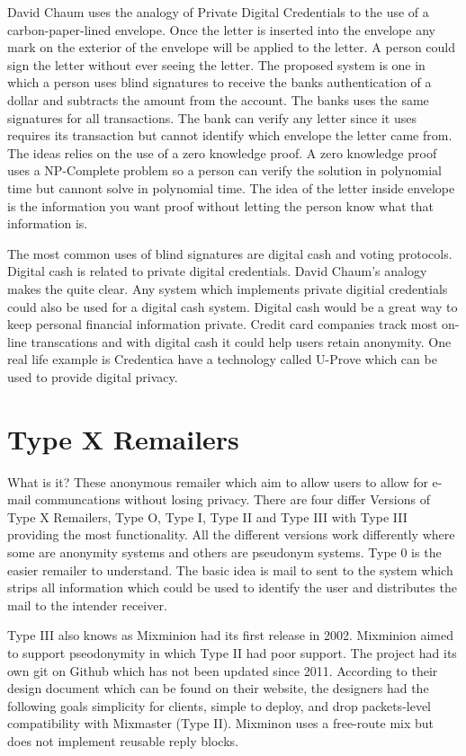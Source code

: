 \documentclass[12pt]{article}
\begin{document}
David Chaum uses the analogy of Private Digital Credentials to the use of a carbon-paper-lined envelope. Once the letter is inserted into the envelope any mark on the exterior of the envelope will be applied to the letter. A person could sign the letter without ever seeing the letter. The proposed system is one in which a person uses blind signatures to receive the banks authentication of a dollar and subtracts the amount from the account. The banks uses the same signatures for all transactions. The bank can verify any letter since it uses requires its transaction but cannot identify which envelope the letter came from. The ideas relies on the use of a zero knowledge proof. A zero knowledge proof uses a NP-Complete problem so a person can verify the solution in polynomial time but cannont solve in polynomial time. The idea of the letter inside envelope is the information you want proof without letting the person know what that information is.

The most common uses of blind signatures are digital cash and voting protocols. Digital cash is related to private digital credentials. David Chaum's analogy makes the quite clear. Any system which implements private digitial credentials could also be used for a digital cash system. Digital cash would be a great way to keep personal financial information private. Credit card companies track most on-line transcations and with digital cash it could help users retain anonymity. One real life example is Credentica have a technology called U-Prove which can be used to provide digital privacy.



\section{Type X Remailers}\label{sec:type-x}
What is it?
These anonymous remailer which aim to allow users to allow for e-mail communcations without losing privacy. There are four differ Versions of Type X Remailers, Type O, Type I, Type II and Type III with Type III providing the most functionality. All the different versions work differently where some are anonymity systems and others are pseudonym systems. Type 0 is the easier remailer to understand. The basic idea is mail to sent to the system which strips all information which could be used to identify the user and distributes the mail to the intender receiver.

Type III also knows as Mixminion had its first  release in 2002. Mixminion aimed to support pseodonymity in which Type II had poor support\cite{GoldbertTwo}. The project had its own git on Github which has not been updated since 2011. According to their design document which can be found on their website, the designers had the following goals simplicity for clients, simple to deploy, and drop packets-level compatibility with Mixmaster (Type II).  Mixminon uses a free-route mix but does not implement reusable reply blocks.
\end{document}
